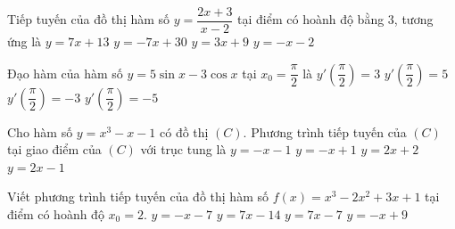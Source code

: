 \begin{ex}%
	Tiếp tuyến của đồ thị hàm số $y=\dfrac{2x+3}{x-2}$  tại điểm có hoành độ bằng $3$, tương ứng là
	 \choice
		 {$y=7x+13$}
		{\True $y=-7x+30$} 
		 {$y=3x+9$}
		{$y=-x-2$} 
\end{ex}

\begin{ex}%
	Đạo hàm của hàm số $y = 5\sin{x} -  3\cos{x}$ tại $x_0 = \dfrac{\pi}{2}$ là
	\choice 
		{\True $y'\left(\dfrac{\pi}{2}  \right) = 3$}
		 {$y'\left(\dfrac{\pi}{2} \right) = 5$}
		{$y'\left(\dfrac{\pi}{2} \right) =  -3$}
		{$y'\left(\dfrac{\pi}{2}  \right) = -5$}
\end{ex}

\begin{ex}%
	 Cho hàm số $y=x^3-x-1$ có đồ thị $(C)$. Phương trình tiếp tuyến của $(C)$ tại giao điểm của $(C)$ với trục tung là
	\choice 
		{$y=-x-1$} 
		{\True  $y=-x+1$}
		 {$y=2x+2$}
		 {$y=2x-1$}
\end{ex}

\begin{ex}%
	Viết phương trình tiếp tuyến của đồ thị  hàm số $f(x)=x^3-2x^2+3x+1$ tại điểm có hoành độ $x_0=2$.
	 \choice
		 {$y=-x-7$}
		{$y=7x-14$} 
		 {\True $y=7x-7$}
		 {$y=-x+9$}
\end{ex}


